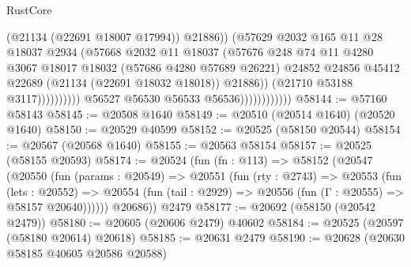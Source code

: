 \begin{lexlean}{RustCore}
\begin{coremodule}
                                                (@21134 (@22691 @18007 @17994))
                                                @21886))
                                            (@57629
                                              @2032
                                              @165
                                              @11
                                              @28
                                              @18037
                                              @2934
                                              (@57668
                                                @2032
                                                @11
                                                @18037
                                                (@57676
                                                  @248
                                                  @74
                                                  @11
                                                  @4280
                                                  @3067
                                                  @18017
                                                  @18032
                                                  (@57686 @4280 @57689 @26221)
                                                  @24852
                                                  @24856
                                                  @45412
                                                  @22689
                                                  (@21134 (@22691 @18032 @18018))
                                                  @21886))
                                              (@21710 @53188 @3117))))))))))
                            @56527
                            @56530
                            @56533
                            @56536))))))))))))
@58144 := @57160 @58143
@58145 := @20508 @1640
@58149 := @20510 (@20514 @1640) (@20520 @1640)
@58150 := @20529 @40599
@58152 := @20525 (@58150 @20544)
@58154 := @20567 (@20568 @1640)
@58155 := @20563 @58154
@58157 := @20525 (@58155 @20593)
@58174 := @20524
    (fun (fn : @113) =>
    @58152
      (@20547
        (@20550
          (fun (params : @20549) =>
          @20551
            (fun (rty : @2743) =>
            @20553
              (fun (lets : @20552) =>
              @20554 (fun (tail : @2929) => @20556 (fun (Γ : @20555) => @58157 @20640))))))
        @20686))
    @2479
@58177 := @20692 (@58150 (@20542 @2479))
@58180 := @20605 (@20606 @2479) @40602
@58184 := @20525 (@20597 (@58180 @20614) @20618)
@58185 := @20631 @2479
@58190 := @20628 (@20630 @58185 @40605 @20586 @20588)

\end{coremodule}
\end{lexlean}
